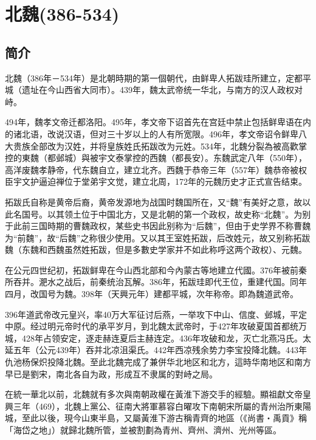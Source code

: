 

\section{北魏\tiny(386-534)}

\subsection{简介}

北魏（386年－534年）是北朝時期的第一個朝代，由鲜卑人拓跋珪所建立，定都平城（遗址在今山西省大同市）。439年，魏太武帝统一华北，与南方的汉人政权对峙。

494年，魏孝文帝迁都洛阳。495年，孝文帝下诏首先在宫廷中禁止包括鲜卑语在内的诸北语，改说汉语，但对三十岁以上的人有所宽限。496年，孝文帝诏令鲜卑八大贵族全部改为汉姓，并将皇族姓氏拓跋改为元姓。534年，北魏分裂為被高歡掌控的東魏（都邺城）與被宇文泰掌控的西魏（都長安）。东魏武定八年（550年），高洋废魏孝静帝，代东魏自立，建立北齐。西魏于恭帝三年（557年）魏恭帝被权臣宇文护逼迫禅位于堂弟宇文觉，建立北周，172年的元魏历史才正式宣告结束。

拓跋氏自称是黄帝后裔，黄帝发源地为战国时魏国所在，又“魏”有美好之意，故以此名国号。以其领土位于中国北方，又是北朝的第一个政权，故史称“北魏”。为别于此前三国時期的曹魏政权，某些史书因此别称为“后魏”，但由于史学界不称曹魏为“前魏”，故“后魏”之称很少使用。又以其王室姓拓跋，后改姓元，故又别称拓跋魏（东魏和西魏虽然姓拓跋，但是多數史学家并不如此称呼这两个政权）、元魏。

在公元四世纪初，拓跋鲜卑在今山西北部和今內蒙古等地建立代國。376年被前秦所吞并。淝水之战后，前秦统治瓦解。386年，拓跋珪即代王位，重建代国。同年四月，改国号为魏。398年（天興元年）建都平城，次年称帝。即為魏道武帝。

396年道武帝改元皇兴，率40万大军征讨后燕，一举攻下中山、信度、邺城，平定中原。经过明元帝时代的承平岁月，到北魏太武帝时，于427年攻破夏国首都统万城，428年占领安定，逐走赫连夏后主赫连定。436年攻破和龙，灭亡北燕冯氏。太延五年（公元439年）吞并北凉沮渠氏。442年西凉残余势力李宝投降北魏。443年仇池杨保炽投降北魏。至此北魏完成了兼併华北地区和北方，這時华南地区和南方早已是劉宋，南北各自为政，形成互不隶属的對峙之局。

在統一華北以前，北魏就有多次與南朝政權在黃淮下游交手的經驗。顯祖獻文帝皇興三年（469），北魏上黨公、征南大將軍慕容白曜攻下南朝宋所屬的青州治所東陽城，至此以後，現今山東半島，又屬黃淮下游古稱青齊的地區（《尚書‧禹貢》稱「海岱之地」）就歸北魏所管，並被割劃為青州、齊州、濟州、光州等區。

